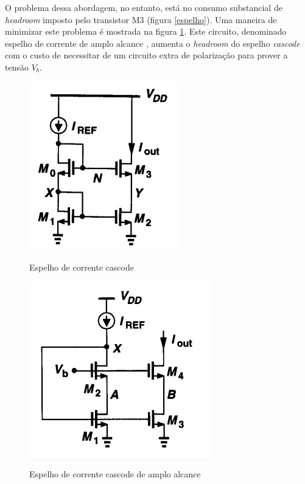 \documentclass[
	12pt,				%
	oneside,			%
	a4paper,			%
	english,			%
	french,				%
	spanish,			%
	brazil				%
	]{abntex2}
\begin{document}
O problema dessa abordagem, no entanto, está no consumo substancial de \textit{headroom} imposto pelo transistor M3 (figura \ref{espelho}). Uma maneira de minimizar este problema é mostrada na figura \ref{cascodeEspelhoWide}. Este circuito, denominado espelho de corrente de amplo alcance \cite{razavi}, aumenta o \textit{headroom} do espelho \textit{cascode} com o custo de necessitar de um circuito extra de polarização para prover a tensão \(V_b\).

\begin{figure}[H]
\centering
\begin{minipage}{.5\textwidth}
  \centering
  \includegraphics[width=.6\linewidth]{cascodeEspelho.PNG}
  \caption{Espelho de corrente cascode}
  \label{espelho}
\end{minipage}%
\begin{minipage}{.5\textwidth}
  \centering
  \includegraphics[width=.68\linewidth]{cascodeEspelhoWide.PNG}
  \caption{Espelho de corrente cascode de amplo alcance}
  \label{cascodeEspelhoWide}
\end{minipage}
\end{figure}
\end{document}
